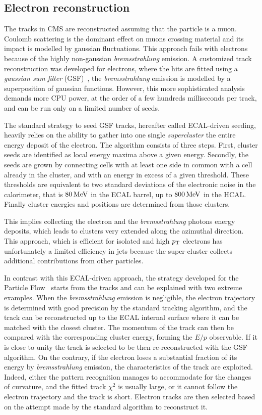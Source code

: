 \subsection{Electron reconstruction}
The tracks in CMS are reconstructed assuming that the particle is a muon.
Coulomb scattering is the dominant effect on muons crossing material and its
impact is modelled by gaussian fluctuations. This approach fails with
electrons because of the highly non-gaussian \emph{bremsstrahlung} emission. A
customized track reconstruction was developed for electrons, where the hits
are fitted using a \emph{gaussian sum filter} (GSF)~\cite{pf:gsf.tracks},
\ie the \emph{bremsstrahlung} emission is modelled by a superposition of
gaussian functions. However, this more sophisticated analysis demands more CPU power, at the order of a few hundreds milliseconds per track, and can be run only on a limited number of seeds.

The standard strategy to seed GSF tracks, hereafter called ECAL-driven seeding, heavily relies on
the ability to gather into one single \emph{supercluster} the entire energy deposit of the electron. 
The algorithm consists of three steps. First, cluster seeds are identified
as local energy maxima above a given energy. Secondly, the seeds are
grown by connecting cells with at least one side in common with
a cell already in the cluster, and with an energy in excess of a given
threshold. These thresholds are equivalent to two standard deviations of the electronic noise in the calorimeter, that is $\unit[80]{MeV}$ in the ECAL barrel, up to $\unit[800]{MeV}$ in the HCAL. Finally cluster energies and positions are determined from those clusters.

This implies collecting the electron and the \emph{bremsstrahlung} photons energy deposits, 
which leads to clusters very extended along the azimuthal direction. 
This approach, which is efficient for isolated and high $p_\mathrm{T}$ electrons has unfortunately 
a limited efficiency in jets because the super-cluster collects 
additional contributions from other particles.

In contrast with this ECAL-driven approach, the strategy developed for the Particle Flow~\cite{pf:electron.reconstruction} starts from
the tracks and can be explained with two extreme examples. 
When the \emph{bremsstrahlung} emission is negligible, the electron
trajectory is determined with good precision by
the standard tracking algorithm, and the track can be reconstructed up to the ECAL internal
surface where it can be matched with the closest cluster. 
The momentum of the track can then be compared with the corresponding cluster energy, 
forming the $E/p$ observable. If it is close to unity the track is selected to be then re-reconstructed
with the GSF algorithm. On the contrary, if the electron loses a substantial fraction of its energy by \emph{bremsstrahlung} emission, the characteristics of the track are exploited. Indeed, either the pattern recognition manages
to accommodate for the changes of curvature, and the fitted track $\chi^2$ is usually large, or
it cannot follow the electron trajectory and the track is short.  
Electron tracks are then selected based on the attempt made by the standard algorithm to reconstruct it. 

